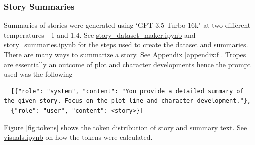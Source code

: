 \documentclass[11pt]{article}
\begin{document}
\subsubsection{Story Summaries}
Summaries of stories were generated using `GPT 3.5 Turbo 16k" at two different temperatures - 1 and 1.4. See \href{https://github.com/armsp/trama/blob/main/story_dataset_maker.ipynb}{story\_dataset\_maker.ipynb} and \href{https://github.com/armsp/trama/blob/main/story_summaries.ipynb}{story\_summaries.ipynb} for the steps used to create the dataset and summaries. There are many ways to summarize a story. See Appendix \ref{appendix:f}. Tropes are essentially an outcome of plot and character developments hence the prompt used was the following - 
\begin{lstlisting}
  [{"role": "system", "content": "You provide a detailed summary of the given story. Focus on the plot line and character development."},
  {"role": "user", "content": <story>}]
\end{lstlisting}
Figure \ref{fig:tokens} shows the token distribution of story and summary text. See \href{https://github.com/armsp/trama/blob/main/visuals.ipynb}{visuals.ipynb} on how the tokens were calculated.
\end{document}

